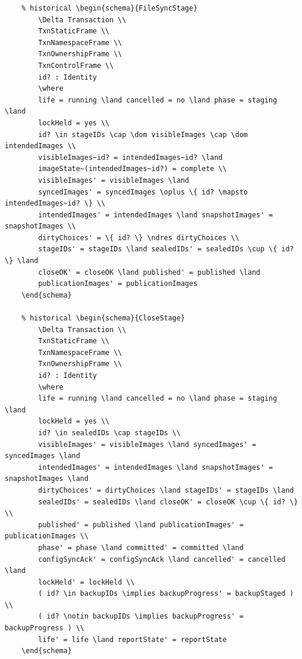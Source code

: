 \documentclass{article}
\begin{document}
\begin{verbatim}
	% historical \begin{schema}{FileSyncStage}
		\Delta Transaction \\
		TxnStaticFrame \\
		TxnNamespaceFrame \\
		TxnOwnershipFrame \\
		TxnControlFrame \\
		id? : Identity
		\where
		life = running \land cancelled = no \land phase = staging \land
		lockHeld = yes \\
		id? \in stageIDs \cap \dom visibleImages \cap \dom intendedImages \\
		visibleImages~id? = intendedImages~id? \land
		imageState~(intendedImages~id?) = complete \\
		visibleImages' = visibleImages \land
		syncedImages' = syncedImages \oplus \{ id? \mapsto intendedImages~id? \} \\
		intendedImages' = intendedImages \land snapshotImages' = snapshotImages \\
		dirtyChoices' = \{ id? \} \ndres dirtyChoices \\
		stageIDs' = stageIDs \land sealedIDs' = sealedIDs \cup \{ id? \} \land
		closeOK' = closeOK \land published' = published \land
		publicationImages' = publicationImages
	\end{schema}

	% historical \begin{schema}{CloseStage}
		\Delta Transaction \\
		TxnStaticFrame \\
		TxnNamespaceFrame \\
		TxnOwnershipFrame \\
		id? : Identity
		\where
		life = running \land cancelled = no \land phase = staging \land
		lockHeld = yes \\
		id? \in sealedIDs \cap stageIDs \\
		visibleImages' = visibleImages \land syncedImages' = syncedImages \land
		intendedImages' = intendedImages \land snapshotImages' = snapshotImages \land
		dirtyChoices' = dirtyChoices \land stageIDs' = stageIDs \land
		sealedIDs' = sealedIDs \land closeOK' = closeOK \cup \{ id? \} \\
		published' = published \land publicationImages' = publicationImages \\
		phase' = phase \land committed' = committed \land
		configSyncAck' = configSyncAck \land cancelled' = cancelled \land
		lockHeld' = lockHeld \\
		( id? \in backupIDs \implies backupProgress' = backupStaged ) \\
		( id? \notin backupIDs \implies backupProgress' = backupProgress ) \\
		life' = life \land reportState' = reportState
	\end{schema}


\end{verbatim}
\end{document}
